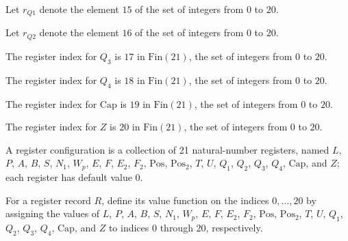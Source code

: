 \begin{definition}
\label{Complexity.Codec.rQ1}
\leanok
Let $r_{Q1}$ denote the element $15$ of the set of integers from $0$ to $20$.
\end{definition}

\begin{definition}
\label{Complexity.Codec.rQ2}
\leanok
Let $r_{Q2}$ denote the element $16$ of the set of integers from $0$ to $20$.
\end{definition}

\begin{definition}
\label{Complexity.Codec.rQ3}
\leanok
The register index for $Q_3$ is $17$ in $\text{Fin}(21)$, the set of integers from $0$ to
$20$.
\end{definition}

\begin{definition}
\label{Complexity.Codec.rQ4}
\leanok
The register index for $Q_4$ is $18$ in $\text{Fin}(21)$, the set of integers from $0$ to
$20$.
\end{definition}

\begin{definition}
\label{Complexity.Codec.rCap}
\leanok
The register index for $\text{Cap}$ is $19$ in $\text{Fin}(21)$, the set of integers from
$0$ to $20$.
\end{definition}

\begin{definition}
\label{Complexity.Codec.rZ}
\leanok
The register index for $Z$ is $20$ in $\text{Fin}(21)$, the set of integers from $0$ to
$20$.
\end{definition}

\begin{definition}
\label{Complexity.Codec.Regs}
\leanok
A register configuration is a collection of 21 natural-number registers, named $L$, $P$,
$A$, $B$, $S$, $N_1$, $W_p$, $E$, $F$, $E_2$, $F_2$, $\text{Pos}$, $\text{Pos}_2$, $T$,
$U$, $Q_1$, $Q_2$, $Q_3$, $Q_4$, $\text{Cap}$, and $Z$; each register has default value
$0$.
\end{definition}

\begin{definition}
\label{Complexity.Codec.Regs.val}
\leanok
{}
For a register record $R$, define its value function on the indices $0,\ldots,20$ by
assigning the values of $L$, $P$, $A$, $B$, $S$, $N_1$, $W_p$, $E$, $F$, $E_2$, $F_2$,
$\text{Pos}$, $\text{Pos}_2$, $T$, $U$, $Q_1$, $Q_2$, $Q_3$, $Q_4$, $\text{Cap}$, and $Z$
to indices $0$ through $20$, respectively.
\end{definition}

